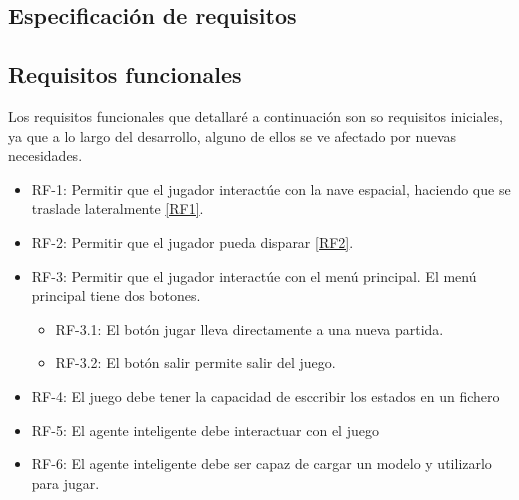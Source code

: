 \subsection{Especificación de requisitos}


\subsection{Requisitos funcionales}
Los requisitos funcionales que detallaré a continuación son so requisitos iniciales, ya que a lo largo del desarrollo, alguno de ellos se ve afectado por nuevas necesidades.

\begin{itemize}
    \item RF-1: Permitir que el jugador interactúe con la nave espacial, haciendo que se traslade lateralmente \ref{RF1}.
    \item RF-2: Permitir que el jugador pueda disparar \ref{RF2}.
    \item RF-3: Permitir que el jugador interactúe con el menú principal. El menú principal tiene dos botones.
        \begin{itemize}
            \item RF-3.1: El botón jugar lleva directamente a una nueva partida.
            \item RF-3.2: El botón salir permite salir del juego.
        \end{itemize}
    \item RF-4: El juego debe tener la capacidad de esccribir los estados en un fichero
    \item RF-5: El agente inteligente debe interactuar con el juego
    \item RF-6: El agente inteligente debe ser capaz de cargar un modelo y utilizarlo para jugar.
\end{itemize}

